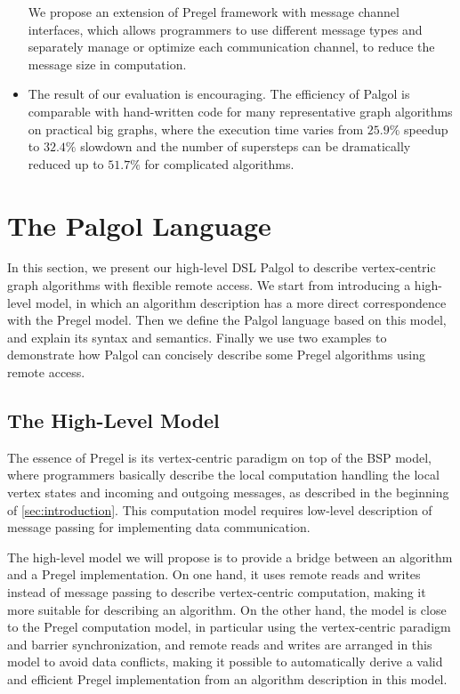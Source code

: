 \documentclass{sokendai_thesis} %
\begin{document}
\begin{itemize}
 We propose an extension of Pregel framework with message channel interfaces, which allows programmers to use different message types and separately manage or optimize each communication channel, to reduce the message size in computation.
\item
 The result of our evaluation is encouraging.
 The efficiency of Palgol is comparable with hand-written code for many representative graph algorithms on practical big graphs, where the execution time varies from $25.9\%$ speedup to $32.4\%$ slowdown and the number of supersteps can be dramatically reduced up to $51.7\%$ for complicated algorithms.
\end{itemize}

\chapter{The Palgol Language}

In this section, we present our high-level DSL Palgol to describe vertex-centric graph algorithms with flexible remote access.
We start from introducing a high-level model, in which an algorithm description has a more direct correspondence with the Pregel model.
Then we define the Palgol language based on this model, and explain its syntax and semantics.
Finally we use two examples to demonstrate how Palgol can concisely describe some Pregel algorithms using remote access.

\section{The High-Level Model}
\label{sec:palgol-model}

The essence of Pregel is its vertex-centric paradigm on top of the BSP model, where programmers basically describe the local computation handling the local vertex states and incoming and outgoing messages, as described in the beginning of \autoref{sec:introduction}.
This computation model requires low-level description of message passing for implementing data communication.

The high-level model we will propose is to provide a bridge between an algorithm and a Pregel implementation.
On one hand, it uses remote reads and writes instead of message passing to describe vertex-centric computation, making it more suitable for describing an algorithm.
On the other hand, the model is close to the Pregel computation model, in particular using the vertex-centric paradigm and barrier synchronization, and remote reads and writes are arranged in this model to avoid data conflicts, making it possible to automatically derive a valid and efficient Pregel implementation from an algorithm description in this model.
\end{document}
